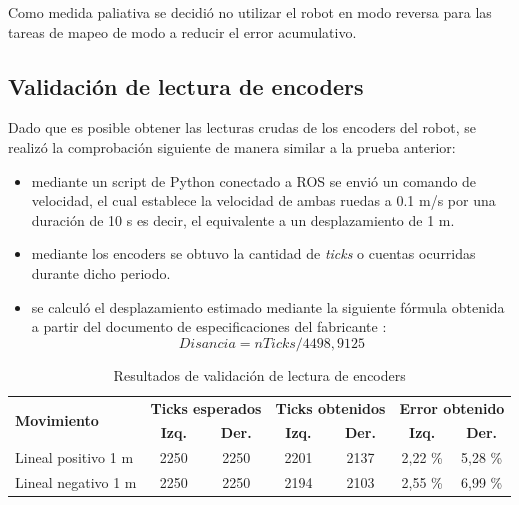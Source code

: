 Como medida paliativa se decidió no utilizar el robot en modo reversa para las tareas de mapeo de modo a reducir el error acumulativo.

\subsection{Validación de lectura de encoders}

Dado que es posible obtener las lecturas crudas de los encoders del robot, se realizó la comprobación siguiente de manera similar a la prueba anterior:

\begin{itemize}
    \item mediante un script de Python conectado a ROS se envió un comando de velocidad, el cual establece la velocidad de ambas ruedas a 0.1 m/s por una duración de 10 s es decir, el equivalente a un desplazamiento de 1 m.
    \item mediante los encoders se obtuvo la cantidad de \textit{ticks} o cuentas ocurridas durante dicho periodo.
    \item se calculó el desplazamiento estimado mediante la siguiente fórmula obtenida a partir del documento de especificaciones del fabricante \citep{PAPER:5}:
          \begin{equation}
              Disancia = nTicks / 4498,9125
          \end{equation}

\end{itemize}

\begin{table}
    \centering
    \caption[Lectura de encoders]{Resultados de validación de lectura de encoders}
    \begin{tabular}{lcccccc}
        \toprule
        \multirow{2}{*}{\textbf{Movimiento}} & \multicolumn{2}{l}{\textbf{Ticks esperados}} & \multicolumn{2}{l}{\textbf{Ticks obtenidos}} & \multicolumn{2}{l}{\textbf{Error obtenido}}                                                 \\
                                             & \textbf{Izq.}                                & \textbf{Der.}                                & \textbf{Izq.}                               & \textbf{Der.} & \textbf{Izq.} & \textbf{Der.} \\
        \midrule
        Lineal positivo 1 m                  & 2250                                         & 2250                                         & 2201                                        & 2137          & 2,22 \%       & 5,28 \%       \\
        Lineal negativo 1 m                  & 2250                                         & 2250                                         & 2194                                        & 2103          & 2,55 \%       & 6,99 \%       \\
        \bottomrule
        \hline
    \end{tabular}
    \label{tab:lecturaEncoders}
\end{table}

